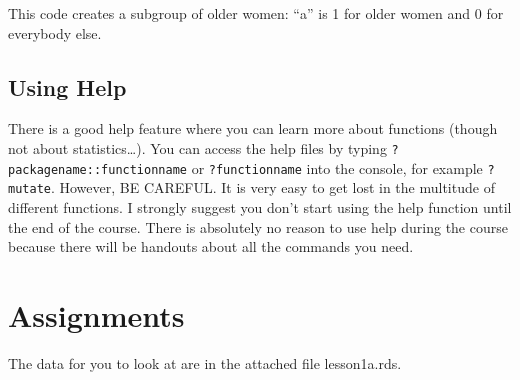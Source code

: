 \documentclass[]{book}
\newenvironment{Shaded}{\begin{snugshade}}{\end{snugshade}}
\newcommand{\DataTypeTok}[1]{\textcolor[rgb]{0.13,0.29,0.53}{#1}}
\newcommand{\DecValTok}[1]{\textcolor[rgb]{0.00,0.00,0.81}{#1}}
\newcommand{\KeywordTok}[1]{\textcolor[rgb]{0.13,0.29,0.53}{\textbf{#1}}}
\newcommand{\NormalTok}[1]{#1}
\newcommand{\OperatorTok}[1]{\textcolor[rgb]{0.81,0.36,0.00}{\textbf{#1}}}
\newcommand{\StringTok}[1]{\textcolor[rgb]{0.31,0.60,0.02}{#1}}
\begin{document}
\begin{Shaded}
\end{Shaded}

This code creates a subgroup of older women: ``a'' is 1 for older women
and 0 for everybody else.

\begin{Shaded}
\end{Shaded}

\hypertarget{using-help}{%
\subsection{Using Help}\label{using-help}}

There is a good help feature where you can learn more about functions
(though not about statistics\ldots). You can access the help files by
typing \texttt{?packagename::functionname} or \texttt{?functionname}
into the console, for example \texttt{?mutate}. However, BE CAREFUL. It
is very easy to get lost in the multitude of different functions. I
strongly suggest you don't start using the help function until the end
of the course. There is absolutely no reason to use help during the
course because there will be handouts about all the commands you need.

\hypertarget{assignments}{%
\section{Assignments}\label{assignments}}

The data for you to look at are in the attached file lesson1a.rds.
\end{document}
